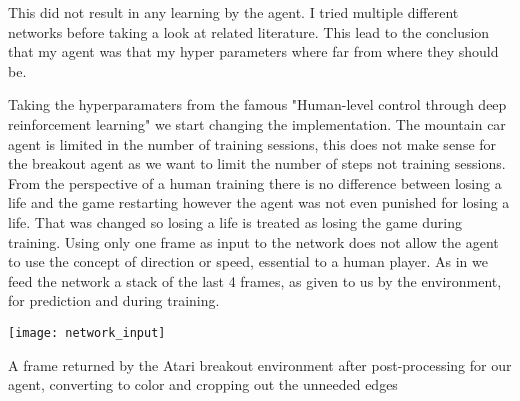 This did not result in any learning by the agent. I tried multiple different networks before taking a look at related literature\cite{atari}. This lead to the conclusion that my agent was that my hyper parameters where far from where they should be.

Taking the hyperparamaters from the famous "Human-level control through deep reinforcement learning"\cite{DQN} we start changing the implementation. The mountain car agent is limited in the number of training sessions, this does not make sense for the breakout agent as we want to limit the number of steps not training sessions. From the perspective of a human training there is no difference between losing a life and the game restarting however the agent was not even punished for losing a life. That was changed so losing a life is treated as losing the game during training.
Using only one frame as input to the network does not allow the agent to use the concept of direction or speed, essential to a human player. As in\cite{DQN} we feed the network a stack of the last 4 frames, as given to us by the environment, for prediction and during training. 

\begin{marginfigure}
    \texttt{[image: network\_input]}
    \caption{A frame returned by the Atari breakout environment after post-processing for our agent, converting to color and cropping out the unneeded edges}
    \label{fig:breakout_postprocess}
\end{marginfigure}


